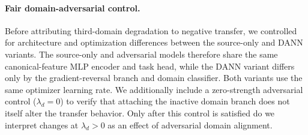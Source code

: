 \paragraph{Fair domain-adversarial control.}
Before attributing third-domain degradation to negative transfer, we controlled for
architecture and optimization differences between the source-only and DANN variants.
The source-only and adversarial models therefore share the same canonical-feature MLP
encoder and task head, while the DANN variant differs only by the gradient-reversal
branch and domain classifier. Both variants use the same optimizer learning rate.
We additionally include a zero-strength adversarial control ($\lambda_d=0$) to verify
that attaching the inactive domain branch does not itself alter the transfer behavior.
Only after this control is satisfied do we interpret changes at $\lambda_d>0$ as an
effect of adversarial domain alignment.
